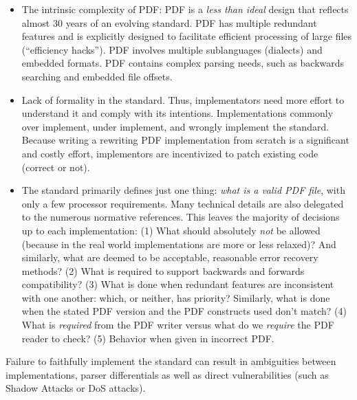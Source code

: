 \begin{itemize}
\item The intrinsic complexity of PDF:
  PDF is a \emph{less than ideal} design that reflects almost 30 years of
  an evolving standard.
  PDF has multiple redundant features and is explicitly designed to facilitate efficient processing of
  large files (``efficiency hacks'').
  PDF involves multiple sublanguages (dialects) and embedded formats.
  PDF contains complex parsing needs, such as backwards searching and
  embedded file offsets.
\item Lack of formality in the standard. Thus, implementators
  need more effort to understand it and comply with its intentions.
  Implementations commonly over implement, under implement,
  and wrongly implement the standard.
  Because writing a rewriting  PDF implementation from scratch is a significant and costly effort,
  implementors are incentivized to patch existing code (correct or not).
\item The standard primarily defines just one thing: \emph{what is a valid PDF file},
  with only a few processor requirements. Many technical details are also delegated to the numerous normative references.
  This leaves the majority of decisions up to each implementation:
  (1) What should absolutely \emph{not} be allowed (because in the real world
    implementations are more or less relaxed)? And similarly,
    what are deemed to be acceptable, reasonable error recovery methods?
  (2) What is required to support backwards and forwards compatibility?
  (3) What is done when redundant features are inconsistent with one
    another: which, or neither, has priority?
    Similarly, what is done when the stated PDF version and the PDF
    constructs used don't match?
  (4) What is \emph{required} from the PDF writer versus
    what do we \emph{require} the PDF reader to check?
  (5) Behavior when given in incorrect PDF.
\end{itemize}

Failure to faithfully implement the standard can result in ambiguities
between implementations, parser differentials as well as direct vulnerabilities (such as
Shadow Attacks or DoS attacks).



